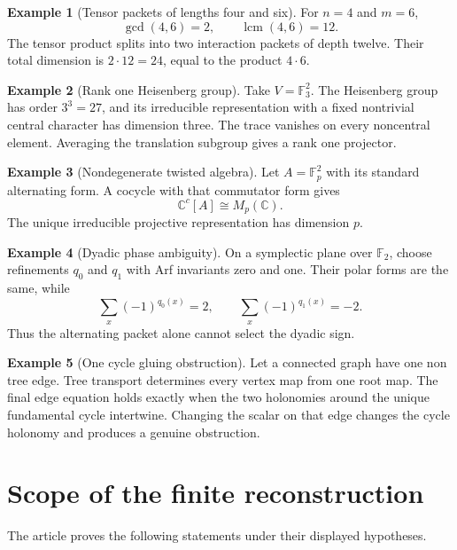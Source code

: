 \documentclass[11pt]{amsart}
\theoremstyle{definition}
\newtheorem{example}[example]{Example}
\theoremstyle{remark}
\newcommand{\CC}{\mathbb C}
\newcommand{\FF}{\mathbb F}
\newcommand{\lcm}{\operatorname{lcm}}
\begin{document}
\begin{example}[Tensor packets of lengths four and six]\label{ex:tensor_46}
For \(n=4\) and \(m=6\),
\[
\gcd(4,6)=2,
\qquad
\lcm(4,6)=12.
\]
The tensor product splits into two interaction packets of depth twelve. Their total dimension is \(2\cdot12=24\), equal to the product \(4\cdot6\).
\end{example}

\begin{example}[Rank one Heisenberg group]\label{ex:heisenberg_rank_one}
Take \(V=\FF_3^2\). The Heisenberg group has order \(3^3=27\), and its irreducible representation with a fixed nontrivial central character has dimension three. The trace vanishes on every noncentral element. Averaging the translation subgroup gives a rank one projector.
\end{example}

\begin{example}[Nondegenerate twisted algebra]\label{ex:twisted_plane}
Let \(A=\FF_p^2\) with its standard alternating form. A cocycle with that commutator form gives
\[
\CC^c[A]\cong M_p(\CC).
\]
The unique irreducible projective representation has dimension \(p\).
\end{example}

\begin{example}[Dyadic phase ambiguity]\label{ex:dyadic_plane}
On a symplectic plane over \(\FF_2\), choose refinements \(q_0\) and \(q_1\) with Arf invariants zero and one. Their polar forms are the same, while
\[
\sum_x(-1)^{q_0(x)}=2,
\qquad
\sum_x(-1)^{q_1(x)}=-2.
\]
Thus the alternating packet alone cannot select the dyadic sign.
\end{example}

\begin{example}[One cycle gluing obstruction]\label{ex:one_cycle}
Let a connected graph have one non tree edge. Tree transport determines every vertex map from one root map. The final edge equation holds exactly when the two holonomies around the unique fundamental cycle intertwine. Changing the scalar on that edge changes the cycle holonomy and produces a genuine obstruction.
\end{example}

\section{Scope of the finite reconstruction}\label{sec:scope}

The article proves the following statements under their displayed hypotheses.
\end{document}
